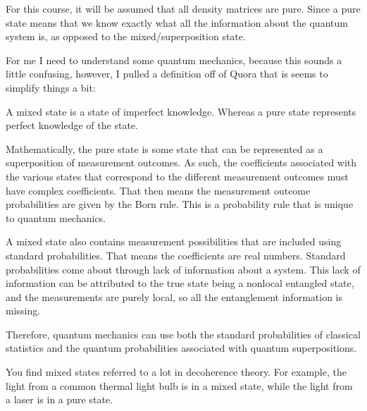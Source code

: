 For this course, it will be assumed that all density matrices are pure. Since a pure state means that we know exactly what all the information about the quantum system is, as opposed to the mixed/superposition state.

For me I need to understand some quantum mechanics, because this sounds a little confusing, however, I pulled a definition off of Quora that is seems to simplify things a bit:

\begin{mdframed}[hidealllines=true,backgroundcolor=black!60, fontcolor = white]
A mixed state is a state of imperfect knowledge. Whereas a pure state represents perfect knowledge of the state.

Mathematically, the pure state is some state that can be represented as a superposition of measurement outcomes. As such, the coefficients associated with the various states that correspond to the different measurement outcomes must have complex coefficients. That then means the measurement outcome probabilities are given by the Born rule. This is a probability rule that is unique to quantum mechanics.

A mixed state also contains measurement possibilities that are included using standard probabilities. That means the coefficients are real numbers. Standard probabilities come about through lack of information about a system. This lack of information can be attributed to the true state being a nonlocal entangled state, and the measurements are purely local, so all the entanglement information is missing.

Therefore, quantum mechanics can use both the standard probabilities of classical statistics and the quantum probabilities associated with quantum superpositions.

You find mixed states referred to a lot in decoherence theory. For example, the light from a common thermal light bulb is in a mixed state, while the light from a laser is in a pure state.
\end{mdframed}